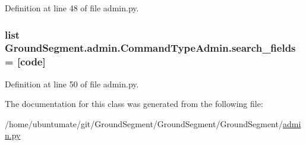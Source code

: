 Definition at line 48 of file admin.\+py.

\hypertarget{class_ground_segment_1_1admin_1_1_command_type_admin_a3a3f190f65a4c32395397c193a0b86e5}{}
\subsubsection[{search\+\_\+fields}]{\setlength{\rightskip}{0pt plus 5cm}list Ground\+Segment.\+admin.\+Command\+Type\+Admin.\+search\+\_\+fields = \mbox{[}\textquotesingle{}code\textquotesingle{}\mbox{]}\hspace{0.3cm}{\ttfamily [static]}}\label{class_ground_segment_1_1admin_1_1_command_type_admin_a3a3f190f65a4c32395397c193a0b86e5}


Definition at line 50 of file admin.\+py.



The documentation for this class was generated from the following file\+:\begin{DoxyCompactItemize}
\item 
/home/ubuntumate/git/\+Ground\+Segment/\+Ground\+Segment/\+Ground\+Segment/\hyperlink{admin_8py}{admin.\+py}\end{DoxyCompactItemize}
